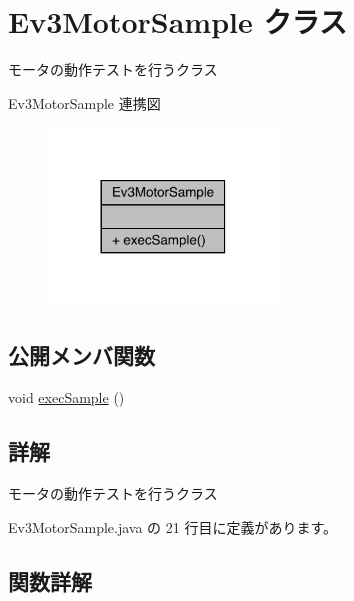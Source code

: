 \hypertarget{class_ev3_motor_sample}{}\section{Ev3\+Motor\+Sample クラス}
\label{class_ev3_motor_sample}


モータの動作テストを行うクラス  




Ev3\+Motor\+Sample 連携図\nopagebreak
\begin{figure}[H]
\begin{center}
\leavevmode
\includegraphics[width=173pt]{dd/df2/class_ev3_motor_sample__coll__graph}
\end{center}
\end{figure}
\subsection*{公開メンバ関数}
\begin{DoxyCompactItemize}
\item 
void \mbox{\hyperlink{class_ev3_motor_sample_a771d6010d23dde59b21aa0f4d06aaf18}{exec\+Sample}} ()
\end{DoxyCompactItemize}


\subsection{詳解}
モータの動作テストを行うクラス 

 Ev3\+Motor\+Sample.\+java の 21 行目に定義があります。



\subsection{関数詳解}
\mbox{\label{class_ev3_motor_sample_a771d6010d23dde59b21aa0f4d06aaf18}} 
